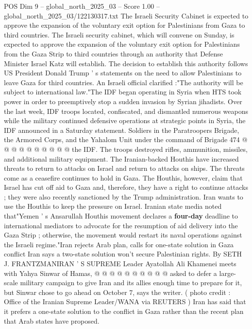 \begin{textsample}{POS Dim 9 – global\_north\_2025\_03 – Score 1.00 – global\_north\_2025\_03/122130317.txt}  \label{ex:f9_pos_388}
The Israeli Security Cabinet is expected to approve the expansion of the voluntary exit option for Palestinians from Gaza to third countries.
The Israeli security cabinet, which will convene on Sunday, is expected to approve the expansion of the voluntary exit option for Palestinians from the Gaza Strip to third countries through an authority that Defense Minister Israel Katz will establish.
The decision to establish this authority follows US President Donald Trump ' s statements on the need to allow Palestinians to leave Gaza for third countries.
An Israeli official clarified :"The authority will be subject to international law."The IDF began operating in Syria when HTS took power in order to preemptively stop a sudden invasion by Syrian jihadists.
Over the last week, IDF troops located, confiscated, and dismantled numerous weapons while the military continued defensive operations at strategic points in Syria, the IDF announced in a Saturday statement.
Soldiers in the Paratroopers Brigade, the Armored Corps, and the Yahalom Unit under the command of Brigade 474 @ @ @ @ @ @ @ @ @ @ the IDF.
The troops destroyed rifles, ammunition, missiles, and additional military equipment.
The Iranian-backed Houthis have increased threats to return to attacks on Israel and return to attacks on ships.
The threats come as a ceasefire continues to hold in Gaza.
The Houthis, however, claim that Israel has cut off aid to Gaza and, therefore, they have a right to continue attacks ; they were also recently sanctioned by the Trump administration.
Iran wants to use the Houthis to keep the pressure on Israel.
Iranian state media noted that"Yemen ' s Ansarullah Houthis movement declares a \textbf{four-day} deadline to international mediators to advocate for the resumption of aid delivery into the Gaza Strip ; otherwise, the movement would restart its naval operations against the Israeli regime."Iran rejects Arab plan, calls for one-state solution in Gaza conflict Iran says a two-state solution won't secure Palestinian rights.
By SETH J.
FRANTZMANIRAN ' S SUPREME Leader Ayatollah Ali Khamenei meets with Yahya Sinwar of Hamas, @ @ @ @ @ @ @ @ @ @ asked to defer a large-scale military campaign to give Iran and its allies enough time to prepare for it, but Sinwar chose to go ahead on October 7, says the writer. ( photo credit : Office of the Iranian Supreme Leader/WANA via REUTERS ) Iran has said that it prefers a one-state solution to the conflict in Gaza rather than the recent plan that Arab states have proposed.

\end{textsample}
